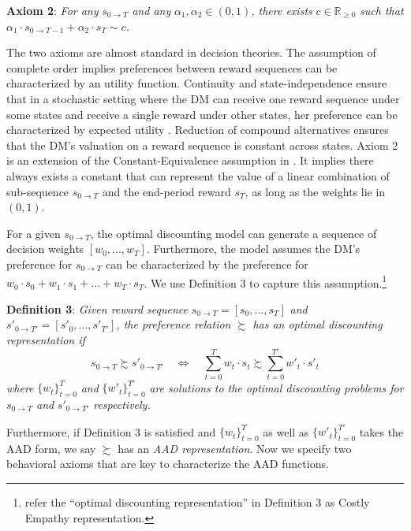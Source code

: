 \documentclass[
  12pt,
]{article}
\begin{document}
\noindent \textbf{Axiom 2}: \emph{For any} \(s_{0\rightarrow T}\)
\emph{and any} \(\alpha_1,\alpha_2 \in (0,1)\)\emph{, there exists}
\(c\in \mathbb{R}_{\geq 0}\) \emph{such that}
\(\alpha_1 \cdot s_{0\rightarrow T-1}+\alpha_2\cdot s_T \sim c\)\emph{.}

The two axioms are almost standard in decision theories. The assumption
of complete order implies preferences between reward sequences can be
characterized by an utility function. Continuity and state-independence
ensure that in a stochastic setting where the DM can receive one reward
sequence under some states and receive a single reward under other
states, her preference can be characterized by expected utility
\citep{herstein1953axiomatic}. Reduction of compound alternatives
ensures that the DM's valuation on a reward sequence is constant across
states. Axiom 2 is an extension of the Constant-Equivalence assumption
in \citet{bleichrodt2008koopmans}. It implies there always exists a
constant that can represent the value of a linear combination of
sub-sequence \(s_{0\rightarrow T}\) and the end-period reward \(s_T\),
as long as the weights lie in \((0,1)\).

For a given \(s_{0\rightarrow T}\), the optimal discounting model can
generate a sequence of decision weights \([w_0,...,w_T]\). Furthermore,
the model assumes the DM's preference for \(s_{0\rightarrow T}\) can be
characterized by the preference for
\(w_0\cdot s_0+w_1\cdot s_1 +...+w_T\cdot s_T\). We use Definition 3 to
capture this assumption.\footnote{\citet{noor2022optimal} refer the
  ``optimal discounting representation'' in Definition 3 as Costly
  Empathy representation.}

\noindent \textbf{Definition 3}: \emph{Given reward sequence}
\(s_{0\rightarrow T}=[s_0,...,s_T]\) \emph{and}
\(s'_{0\rightarrow T'}=[s'_0,...,s'_{T'}]\)\emph{, the preference
relation} \(\succsim\) \emph{has an optimal discounting representation
if} \[
s_{0\rightarrow T} \succsim s'_{0\rightarrow T'}\quad
\Longleftrightarrow \quad \sum_{t=0}^T w_t\cdot s_t
\succsim \sum_{t=0}^{T'} w'_t \cdot s'_t
\] \emph{where} \(\{w_t\}_{t=0}^T\) \emph{and} \(\{w'_t\}^{T'}_{t=0}\)
\emph{are solutions to the optimal discounting problems for}
\(s_{0\rightarrow T}\) \emph{and} \(s'_{0\rightarrow T'}\)
\emph{respectively.}

Furthermore, if Definition 3 is satisfied and \(\{w_t\}_{t=0}^T\) as
well as \(\{w'_t\}^{T'}_{t=0}\) takes the AAD form, we say \(\succsim\)
has an \emph{AAD representation}. Now we specify two behavioral axioms
that are key to characterize the AAD functions.
\end{document}
